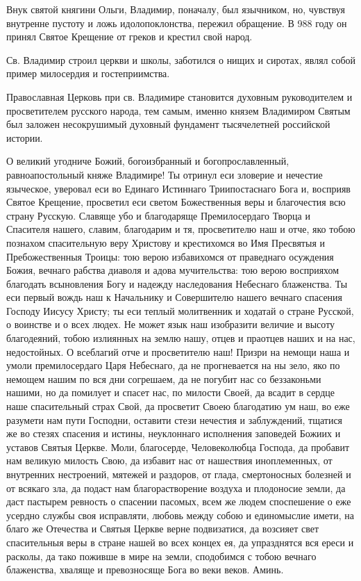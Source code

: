 \begin{mymulticols}


Внук святой княгини Ольги, Владимир, поначалу, был язычником, но, чувствуя внутренне пустоту и ложь идолопоклонства, пережил обращение. В 988 году он принял Святое Крещение от греков и крестил свой народ.


Св. Владимир строил церкви и школы, заботился о нищих и сиротах, являл собой пример милосердия и гостеприимства.


Православная Церковь при св. Владимире становится духовным руководителем и просветителем русского народа, тем самым, именно князем Владимиром Святым был заложен несокрушимый духовный фундамент тысячелетней российской истории.



О великий угодниче Божий, богоизбранный и богопрославленный, равноапостольный княже Владимире! Ты отринул еси зловерие и нечестие языческое, уверовал еси во Единаго Истиннаго Триипостаснаго Бога и, восприяв Святое Крещение, просветил еси светом Божественныя веры и благочестия всю страну Русскую. Славяще убо и благодаряще Премилосердаго Творца и Спасителя нашего, славим, благодарим и тя, просветителю наш и отче, яко тобою познахом спасительную веру Христову и крестихомся во Имя Пресвятыя и Пребожественныя Троицы: тою верою избавихомся от праведнаго осуждения Божия, вечнаго рабства диаволя и адова мучительства: тою верою восприяхом благодать всыновления Богу и надежду наследования Небеснаго блаженства. Ты еси первый вождь наш к Начальнику и Совершителю нашего вечнаго спасения Господу Иисусу Христу; ты еси теплый молитвенник и ходатай о стране Русской, о воинстве и о всех людех. Не может язык наш изобразити величие и высоту благодеяний, тобою излиянных на землю нашу, отцев и праотцев наших и на нас, недостойных. О всеблагий отче и просветителю наш! Призри на немощи наша и умоли премилосердаго Царя Небеснаго, да не прогневается на ны зело, яко по немощем нашим по вся дни согрешаем, да не погубит нас со беззаконьми нашими, но да помилует и спасет нас, по милости Своей, да всадит в сердце наше спасительный страх Свой, да просветит Своею благодатию ум наш, во еже разумети нам пути Господни, оставити стези нечестия и заблуждений, тщатися же во стезях спасения и истины, неуклоннаго исполнения заповедей Божиих и уставов Святыя Церкве. Моли, благосерде, Человеколюбца Господа, да пробавит нам великую милость Свою, да избавит нас от нашествия иноплеменных, от внутренних нестроений, мятежей и раздоров, от глада, смертоносных болезней и от всякаго зла, да подаст нам благорастворение воздуха и плодоносие земли, да даст пастырем ревность о спасении пасомых, всем же людем споспешение о еже усердно службы своя исправляти, любовь между собою и единомыслие имети, на благо же Отечества и Святыя Церкве верне подвизатися, да возсияет свет спасительныя веры в стране нашей во всех концех ея, да упразднятся вся ереси и расколы, да тако поживше в мире на земли, сподобимся с тобою вечнаго блаженства, хваляще и превозносяще Бога во веки веков. Аминь.



\end{mymulticols}

